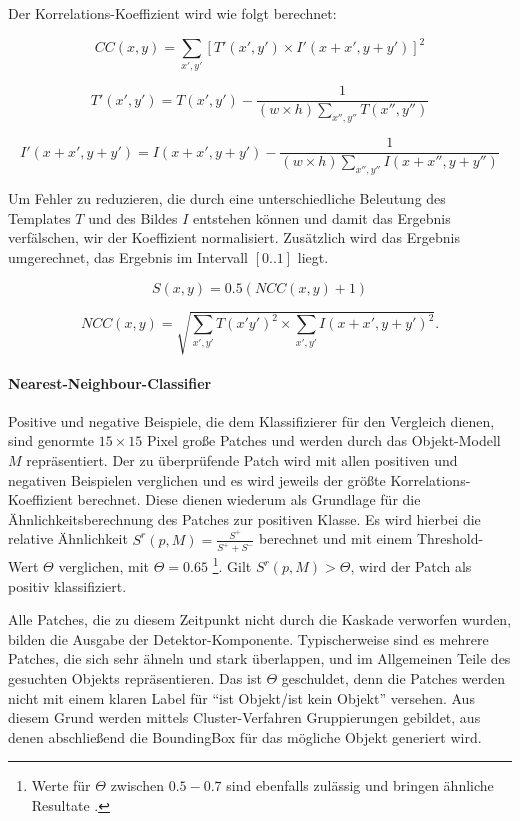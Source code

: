 Der Korrelations-Koeffizient wird wie folgt berechnet:

\[
CC(x,y)=\underset{x',y'}{\sum}[T'(x',y')\times I'(x+x',y+y')]^{2}
\]


\[
T'(x',y')=T(x',y')-\frac{1}{(w\times h)\underset{x'',y''}{\sum}T(x'',y'')}
\]


\[
I'(x+x',y+y')=I(x+x',y+y')-\frac{1}{(w\times h)\underset{x'',y''}{\sum}I(x+x'',y+y'')}
\]


Um Fehler zu reduzieren, die durch eine unterschiedliche Beleutung
des Templates $T$ und des Bildes $I$ entstehen können und damit
das Ergebnis verfälschen, wir der Koeffizient normalisiert. Zusätzlich
wird das Ergebnis umgerechnet, das Ergebnis im Intervall $[0..1]$
liegt.

\[
S(x,y)=0.5(NCC(x,y)+1)
\]


\[
NCC(x,y)=\sqrt{\underset{x',y'}{\sum}T(x'y')^{2}\times\underset{x',y'}{\sum}I(x+x',y+y')^{2}}.
\]



\paragraph{Nearest-Neighbour-Classifier}



Positive und negative Beispiele, die dem Klassifizierer für den Vergleich
dienen, sind genormte $15\times15$ Pixel große Patches und werden
durch das Objekt-Modell $M$ repräsentiert. Der zu überprüfende Patch
wird mit allen positiven und negativen Beispielen verglichen und es
wird jeweils der größte Korrelations-Koeffizient berechnet. Diese
dienen wiederum als Grundlage für die Ähnlichkeitsberechnung des Patches
zur positiven Klasse. Es wird hierbei die relative Ähnlichkeit $S^{r}(p,M)=\frac{S^{+}}{S^{+}+S^{-}}$
berechnet und mit einem Threshold-Wert $\Theta$ verglichen, mit $\Theta=0.65$%
\footnote{Werte für $\Theta$ zwischen $0.5-0.7$ sind ebenfalls zulässig und
bringen ähnliche Resultate \cite{TLD}.%
}. Gilt $S^{r}(p,M)>\Theta$, wird der Patch als positiv klassifiziert.

Alle Patches, die zu diesem Zeitpunkt nicht durch die Kaskade verworfen
wurden, bilden die Ausgabe der Detektor-Komponente. Typischerweise
sind es mehrere Patches, die sich sehr ähneln und stark überlappen,
und im Allgemeinen Teile des gesuchten Objekts repräsentieren. Das
ist $\Theta$ geschuldet, denn die Patches werden nicht mit einem
klaren Label für ``ist Objekt/ist kein Objekt'' versehen. Aus diesem
Grund werden mittels Cluster-Verfahren Gruppierungen gebildet, aus
denen abschließend die BoundingBox für das mögliche Objekt generiert
wird. 



